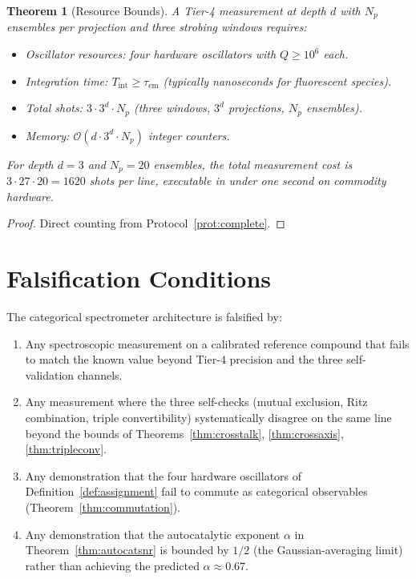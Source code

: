 \documentclass[11pt,a4paper]{article}
\theoremstyle{thmstyle}
\newtheorem{theorem}{Theorem}[section]
\theoremstyle{axiomstyle}
\theoremstyle{definition}
\theoremstyle{remark}
\begin{document}
\begin{theorem}[Resource Bounds]\label{thm:resources}
A Tier-4 measurement at depth $d$ with $N_{p}$ ensembles per projection and three strobing windows requires:
\begin{itemize}[nosep]
\item \emph{Oscillator resources:} four hardware oscillators with $Q\geq 10^{6}$ each.
\item \emph{Integration time:} $T_{\mathrm{int}}\geq\tau_{\mathrm{em}}$ (typically nanoseconds for fluorescent species).
\item \emph{Total shots:} $3\cdot 3^{d}\cdot N_{p}$ (three windows, $3^{d}$ projections, $N_{p}$ ensembles).
\item \emph{Memory:} $\mathcal{O}(d\cdot 3^{d}\cdot N_{p})$ integer counters.
\end{itemize}
For depth $d=3$ and $N_{p}=20$ ensembles, the total measurement cost is $3\cdot 27\cdot 20=1620$ shots per line, executable in under one second on commodity hardware.
\end{theorem}

\begin{proof}
Direct counting from Protocol~\ref{prot:complete}.
\end{proof}

\section{Falsification Conditions}
\label{sec:methods_falsify}

The categorical spectrometer architecture is falsified by:
\begin{enumerate}[nosep]
\item Any spectroscopic measurement on a calibrated reference compound that fails to match the known value beyond Tier-4 precision and the three self-validation channels.
\item Any measurement where the three self-checks (mutual exclusion, Ritz combination, triple convertibility) systematically disagree on the same line beyond the bounds of Theorems~\ref{thm:crosstalk}, \ref{thm:crossaxis}, \ref{thm:tripleconv}.
\item Any demonstration that the four hardware oscillators of Definition~\ref{def:assignment} fail to commute as categorical observables (Theorem~\ref{thm:commutation}).
\item Any demonstration that the autocatalytic exponent $\alpha$ in Theorem~\ref{thm:autocatsnr} is bounded by $1/2$ (the Gaussian-averaging limit) rather than achieving the predicted $\alpha\approx 0.67$.
\end{enumerate}
\end{document}
